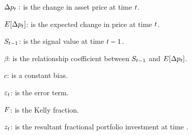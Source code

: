 \documentclass{article}
\begin{document}
$\Delta p_{t}:$ is the change in asset price at time $t$.

$E[\Delta p_{t}]$: is the expected change in price at time $t$.

$S_{t-1}$: is the signal value at time $t-1$.

$\beta$: is the relationship coefficient between $S_{t-1}$ and $E[\Delta p_{t}]$.

$c$: is a constant bias.

$\varepsilon_{t}$: is the error term.

$F$: is the Kelly fraction.

$z_{t}$: is the resultant fractional portfolio investment at time \currenttime.


\keyterms
\furtherlinks %
\end{document}
